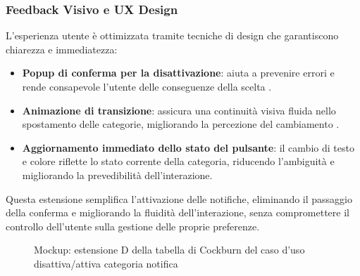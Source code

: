 \subsubsection{Feedback Visivo e UX Design}
L’esperienza utente è ottimizzata tramite tecniche di design che garantiscono chiarezza e immediatezza:

\begin{itemize}
    \item \textbf{Popup di conferma per la disattivazione}: aiuta a prevenire errori e rende consapevole l’utente delle conseguenze della scelta \cite{nielsen1995}.
    \item \textbf{Animazione di transizione}: assicura una continuità visiva fluida nello spostamento delle categorie, migliorando la percezione del cambiamento \cite{miller1956}.
    \item \textbf{Aggiornamento immediato dello stato del pulsante}: il cambio di testo e colore riflette lo stato corrente della categoria, riducendo l’ambiguità e migliorando la prevedibilità dell’interazione.
\end{itemize}

Questa estensione semplifica l’attivazione delle notifiche, eliminando il passaggio della conferma e migliorando la fluidità dell’interazione, senza compromettere il controllo dell’utente sulla gestione delle proprie preferenze.

\begin{figure}[ht]
    \centering
    \caption{Mockup: estensione D della tabella di Cockburn del caso d'uso disattiva/attiva categoria notifica}
    \label{fig:mockup_estensione_D_disattiva_notifiche}
\end{figure}

\newpage

